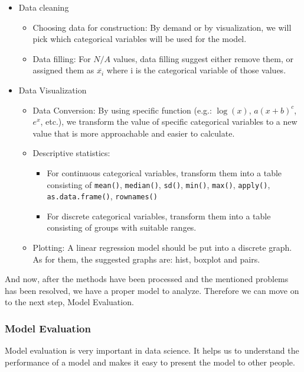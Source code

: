\documentclass[a4paper]{article}
\numberwithin{equation}{section}
\begin{document}
\begin{itemize}
  \item Data cleaning
        \begin{itemize}
          \item Choosing data for construction: By demand or by visualization, we will pick which categorical variables will be used for the model.
          \item Data filling: For \(N/A\) values, data filling  suggest either remove them, or assigned them as \(\overline{x_i}\) where i is the categorical variable of those values.
        \end{itemize}
  \item Data Visualization
        \begin{itemize}
          \item Data Conversion: By using specific function (e.g.: \(\log(x)\), \(a{(x+b)}^c\), \(e^x\), etc.), we transform the value of specific categorical variables to a new value that is more approachable and easier to calculate.
          \item Descriptive statistics:
                \begin{itemize}
                  \item For continuous categorical variables, transform them into a table consisting of \texttt{mean()}, \texttt{median()}, \texttt{sd()}, \texttt{min()}, \texttt{max()}, \texttt{apply()}, \texttt{as.data.frame()}, \texttt{rownames()}
                  \item For discrete categorical variables, transform them into a table consisting of groups with suitable ranges.
                \end{itemize}
          \item Plotting: A linear regression model should be put into a discrete graph.
                As for them, the suggested graphs are: hist, boxplot and pairs.
        \end{itemize}
\end{itemize}

And now, after the methods have been processed and the mentioned problems has been resolved, we have a proper model to analyze.
Therefore we can move on to the next step, Model Evaluation.

\subsubsection{Model Evaluation}
Model evaluation is very important in data science.
It helps us to understand the performance of a model and makes it easy to present the model to other people.
\end{document}
